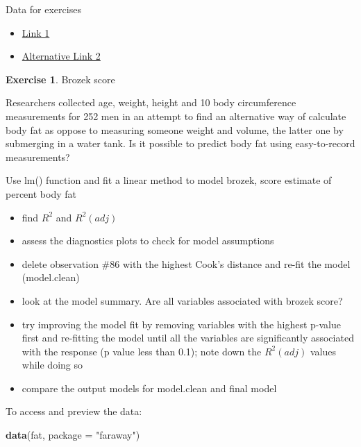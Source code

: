 \documentclass[
]{book}
\newenvironment{Shaded}{\begin{snugshade}}{\end{snugshade}}
\newcommand{\DataTypeTok}[1]{\textcolor[rgb]{0.13,0.29,0.53}{#1}}
\newcommand{\KeywordTok}[1]{\textcolor[rgb]{0.13,0.29,0.53}{\textbf{#1}}}
\newcommand{\NormalTok}[1]{#1}
\newcommand{\StringTok}[1]{\textcolor[rgb]{0.31,0.60,0.02}{#1}}
\providecommand{\tightlist}{%
  \setlength{\itemsep}{0pt}\setlength{\parskip}{0pt}}
\theoremstyle{definition}
\theoremstyle{definition}
\theoremstyle{definition}
\newtheorem{exercise}{Exercise}[chapter]
\theoremstyle{remark}
\begin{document}
Data for exercises

\begin{itemize}
\tightlist
\item
  \href{https://github.com/olgadet/bookdown-mlbiostatistics/tree/master/data/lm/data.zip}{Link 1}
\item
  \href{https://stockholmuniversity.box.com/s/z5kwg0nlwe5la4h5t8bshpj57pylif14}{Alternative Link 2}
\end{itemize}

\begin{exercise}
\protect\hypertarget{exr:lm-brozek}{}{\label{exr:lm-brozek} }
Brozek score

Researchers collected age, weight, height and 10 body circumference measurements for 252 men in an attempt to find an alternative way of calculate body fat as oppose to measuring someone weight and volume, the latter one by submerging in a water tank. Is it possible to predict body fat using easy-to-record measurements?

Use lm() function and fit a linear method to model brozek, score estimate of percent body fat

\begin{itemize}
\tightlist
\item
  find \(R^2\) and \(R^2(adj)\)
\item
  assess the diagnostics plots to check for model assumptions
\item
  delete observation \#86 with the highest Cook's distance and re-fit the model (model.clean)
\item
  look at the model summary. Are all variables associated with brozek score?
\item
  try improving the model fit by removing variables with the highest p-value first and re-fitting the model until all the variables are significantly associated with the response (p value less than 0.1); note down the \(R^2(adj)\) values while doing so
\item
  compare the output models for model.clean and final model
\end{itemize}
\end{exercise}

To access and preview the data:

\begin{Shaded}
\begin{Highlighting}[]
\KeywordTok{data}\NormalTok{(fat, }\DataTypeTok{package =} \StringTok{"faraway"}\NormalTok{)}
\end{Highlighting}
\end{Shaded}
\end{document}
